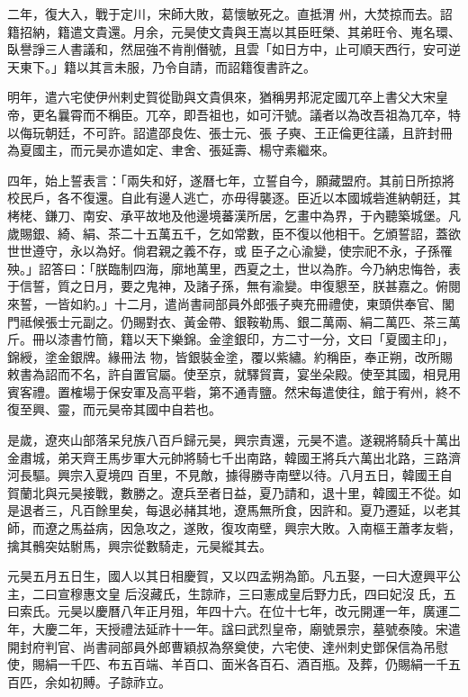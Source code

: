 \begin{pinyinscope}
 二年，復大入，戰于定川，宋師大敗，葛懷敏死之。直抵渭
 州，大焚掠而去。詔籍招納，籍遣文貴還。月余，元昊使文貴與王嵩以其臣旺榮、其弟旺令、嵬名環、臥譽諍三人書議和，然屈強不肯削僭號，且雲「如日方中，止可順天西行，安可逆天東下。」籍以其言未服，乃令自請，而詔籍復書許之。



 明年，遣六宅使伊州剌史賀從勖與文貴俱來，猶稱男邦泥定國兀卒上書父大宋皇帝，更名曩霄而不稱臣。兀卒，即吾祖也，如可汗號。議者以為改吾祖為兀卒，特以侮玩朝廷，不可許。詔遣邵良佐、張士元、張
 子奭、王正倫更往議，且許封冊為夏國主，而元昊亦遣如定、聿舍、張延壽、楊守素繼來。



 四年，始上誓表言：「兩失和好，遂曆七年，立誓自今，願藏盟府。其前日所掠將校民戶，各不復還。自此有邊人逃亡，亦毋得襲逐。臣近以本國城砦進納朝廷，其栲栳、鎌刀、南安、承平故地及他邊境蕃漢所居，乞畫中為界，于內聽築城堡。凡歲賜銀、綺、絹、茶二十五萬五千，乞如常數，臣不復以他相干。乞頒誓詔，蓋欲世世遵守，永以為好。倘君親之義不存，或
 臣子之心渝變，使宗祀不永，子孫罹殃。」詔答曰：「朕臨制四海，廓地萬里，西夏之土，世以為胙。今乃納忠悔咎，表于信誓，質之日月，要之鬼神，及諸子孫，無有渝變。申復懇至，朕甚嘉之。俯閱來誓，一皆如約。」十二月，遣尚書祠部員外郎張子奭充冊禮使，東頭供奉官、閣門祗候張士元副之。仍賜對衣、黃金帶、銀鞍勒馬、銀二萬兩、絹二萬匹、茶三萬斤。冊以漆書竹簡，籍以天下樂錦。金塗銀印，方二寸一分，文曰「夏國主印」，錦綬，塗金銀牌。緣冊法
 物，皆銀裝金塗，覆以紫繡。約稱臣，奉正朔，改所賜敕書為詔而不名，許自置官屬。使至京，就驛貿賣，宴坐朵殿。使至其國，相見用賓客禮。置榷場于保安軍及高平砦，第不通青鹽。然宋每遣使往，館于宥州，終不復至興、靈，而元昊帝其國中自若也。



 是歲，遼夾山部落呆兒族八百戶歸元昊，興宗責還，元昊不遣。遂親將騎兵十萬出金肅城，弟天齊王馬步軍大元帥將騎七千出南路，韓國王將兵六萬出北路，三路濟河長驅。興宗入夏境四
 百里，不見敵，據得勝寺南壁以待。八月五日，韓國王自賀蘭北與元昊接戰，數勝之。遼兵至者日益，夏乃請和，退十里，韓國王不從。如是退者三，凡百餘里矣，每退必赭其地，遼馬無所食，因許和。夏乃遷延，以老其師，而遼之馬益病，因急攻之，遂敗，復攻南壁，興宗大敗。入南樞王蕭孝友砦，擒其鶻突姑駙馬，興宗從數騎走，元昊縱其去。



 元昊五月五日生，國人以其日相慶賀，又以四孟朔為節。凡五娶，一曰大遼興平公主，二曰宣穆惠文皇
 后沒藏氏，生諒祚，三曰憲成皇后野力氏，四曰妃沒𠼪氏，五曰索氏。元昊以慶曆八年正月殂，年四十六。在位十七年，改元開運一年，廣運二年，大慶二年，天授禮法延祚十一年。諡曰武烈皇帝，廟號景宗，墓號泰陵。宋遣開封府判官、尚書祠部員外郎曹穎叔為祭奠使，六宅使、達州刺史鄧保信為吊慰使，賜絹一千匹、布五百端、羊百口、面米各百石、酒百瓶。及葬，仍賜絹一千五百匹，余如初賻。子諒祚立。




\end{pinyinscope}
